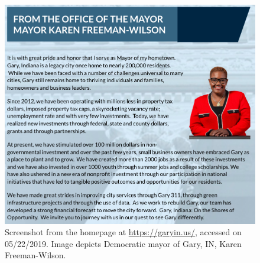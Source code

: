 \documentclass[11pt]{article}
\begin{document}
\begin{figure}
\centering
\includegraphics[scale=0.45]{figures/gary_hp}
\caption{Screenshot from the homepage at \url{https://garyin.us/}, accessed on 05/22/2019. Image depicts Democratic mayor of Gary, IN, Karen Freeman-Wilson.} \vspace{-.3cm}
\label{fig:garymayor}
\end{figure}


\end{document}
